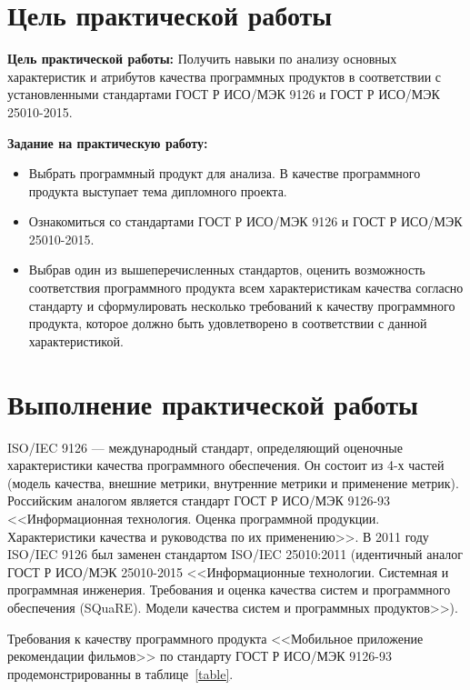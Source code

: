 \section*{\LARGE Цель практической работы}

\textbf{Цель практической работы:}
Получить навыки по анализу основных характеристик и атрибутов
качества программных продуктов в соответствии с установленными
стандартами ГОСТ Р ИСО/МЭК 9126 и ГОСТ Р ИСО/МЭК 25010-2015.

\textbf{Задание на практическую работу:}

\begin{itemize}
    \item Выбрать программный продукт для анализа. В качестве программного
    продукта выступает тема дипломного проекта.
    \item Ознакомиться со стандартами
    ГОСТ Р ИСО/МЭК 9126 и ГОСТ Р ИСО/МЭК 25010-2015.
    \item Выбрав один из вышеперечисленных стандартов, оценить
    возможность соответствия программного продукта всем характеристикам
    качества согласно стандарту и сформулировать несколько требований к
    качеству программного продукта, которое должно быть удовлетворено в
    соответствии с данной характеристикой.
\end{itemize}

\clearpage

\section*{\LARGE Выполнение практической работы}

ISO/IEC 9126 --- международный стандарт, определяющий оценочные
характеристики качества программного обеспечения. Он состоит из 4-х частей
(модель качества, внешние метрики, внутренние метрики и применение
метрик). Российским аналогом является стандарт ГОСТ Р ИСО/МЭК 9126-93
<<Информационная технология. Оценка программной продукции.
Характеристики качества и руководства по их применению>>.
В 2011 году ISO/IEC 9126 был заменен стандартом ISO/IEC 25010:2011
(идентичный аналог ГОСТ Р ИСО/МЭК 25010-2015 <<Информационные
технологии. Системная и программная инженерия. Требования и оценка
качества систем и программного обеспечения (SQuaRE). Модели качества
систем и программных продуктов>>).

Требования к качеству программного продукта
<<Мобильное приложение рекомендации фильмов>> по стандарту ГОСТ Р ИСО/МЭК 9126-93
продемонстрированны в таблице~\ref{table}.

